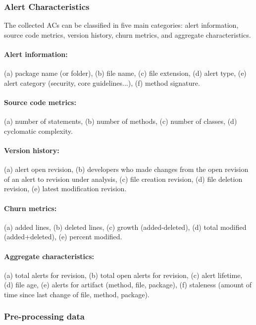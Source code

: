 \subsubsection{Alert Characteristics}

The collected ACs can be classified in five main categories: alert information, source code metrics, version history, churn metrics, and aggregate characteristics.

\paragraph{Alert information:} (a) package name (or folder), (b) file name, (c) file extension, (d) alert type, (e) alert category (security, core guidelines...), (f) method signature.

\paragraph{Source code metrics:} (a) number of statements, (b) number of methods, (c) number of classes, (d) cyclomatic complexity.

\paragraph{Version history:} (a) alert open revision, (b) developers who made changes from the open revision of an alert to revision under analysis, (c) file creation revision, (d) file deletion revision, (e) latest modification revision.

\paragraph{Churn metrics:} (a) added lines, (b) deleted lines, (c) growth (added-deleted), (d) total modified (added+deleted), (e) percent modified.

\paragraph{Aggregate characteristics:} (a) total alerts for revision, (b) total open alerts for revision, (c) alert lifetime, (d) file age, (e) alerts for artifact (method, file, package), (f) staleness (amount of time since last change of file, method, package).


\subsubsection{Pre-processing data}

